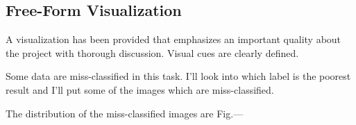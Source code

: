 \subsection{Free-Form Visualization}
A visualization has been provided that emphasizes an important quality about the project with thorough discussion. Visual cues are clearly defined.

Some data are miss-classified in this task. I'll look into which label is the poorest result and I'll put some of the images which are miss-classified.

The distribution of the miss-classified images are Fig.---

